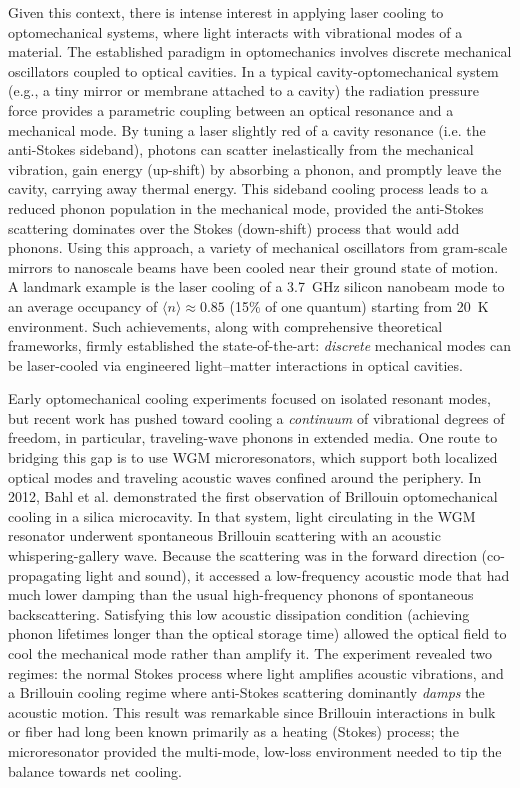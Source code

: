 Given this context, there is intense interest in applying laser cooling to optomechanical systems, where light interacts with vibrational modes of a material. The established paradigm in optomechanics involves discrete mechanical oscillators coupled to optical cavities. \cite{aspelmeyer2014cavity} In a typical cavity-optomechanical system (e.g., a tiny mirror or membrane attached to a cavity) the radiation pressure force provides a parametric coupling between an optical resonance and a mechanical mode. \cite{aspelmeyer2014cavity} By tuning a laser slightly red of a cavity resonance (i.e. the anti-Stokes sideband), photons can scatter inelastically from the mechanical vibration, gain energy (up-shift) by absorbing a phonon, and promptly leave the cavity, carrying away thermal energy. This sideband cooling process leads to a reduced phonon population in the mechanical mode, provided the anti-Stokes scattering dominates over the Stokes (down-shift) process that would add phonons. Using this approach, a variety of mechanical oscillators from gram-scale mirrors to nanoscale beams have been cooled near their ground state of motion. \cite{chan2011laser} A landmark example is the laser cooling of a \SI{3.7}{\giga\hertz} silicon nanobeam mode to an average occupancy of \(\langle n\rangle \approx 0.85\) (15\% of one quantum) starting from \SI{20}{\kelvin} environment. \cite{chan2011laser} Such achievements, along with comprehensive theoretical frameworks, \cite{aspelmeyer2014cavity} firmly established the state-of-the-art: \emph{discrete} mechanical modes can be laser-cooled via engineered light–matter interactions in optical cavities.

Early optomechanical cooling experiments focused on isolated resonant modes, but recent work has pushed toward cooling a \emph{continuum} of vibrational degrees of freedom, in particular, traveling-wave phonons in extended media. One route to bridging this gap is to use \ac{WGM} microresonators, which support both localized optical modes and traveling acoustic waves confined around the periphery. In 2012, Bahl et al. demonstrated the first observation of Brillouin optomechanical cooling in a silica microcavity. \cite{bahl2012observation} In that system, light circulating in the \ac{WGM} resonator underwent spontaneous Brillouin scattering with an acoustic whispering-gallery wave. Because the scattering was in the forward direction (co-propagating light and sound), it accessed a low-frequency acoustic mode that had much lower damping than the usual high-frequency phonons of spontaneous backscattering. Satisfying this low acoustic dissipation condition (achieving phonon lifetimes longer than the optical storage time) allowed the optical field to cool the mechanical mode rather than amplify it. The experiment revealed two regimes: the normal Stokes process where light amplifies acoustic vibrations, and a Brillouin cooling regime where anti-Stokes scattering dominantly \emph{damps} the acoustic motion. This result was remarkable since Brillouin interactions in bulk or fiber had long been known primarily as a heating (Stokes) process; the microresonator provided the multi-mode, low-loss environment needed to tip the balance towards net cooling.

